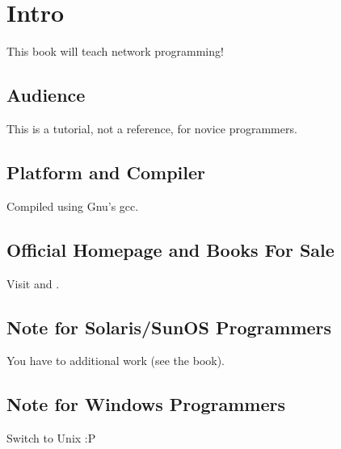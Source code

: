\section{Intro}
This book will teach network programming!

\subsection{Audience}
This is a tutorial, not a reference, for novice programmers.

\subsection{Platform and Compiler}
Compiled using Gnu's gcc.

\subsection{Official Homepage and Books For Sale}
Visit  and .

\subsection{Note for Solaris/SunOS Programmers}
You have to additional work (see the book).

\subsection{Note for Windows Programmers}
Switch to Unix :P